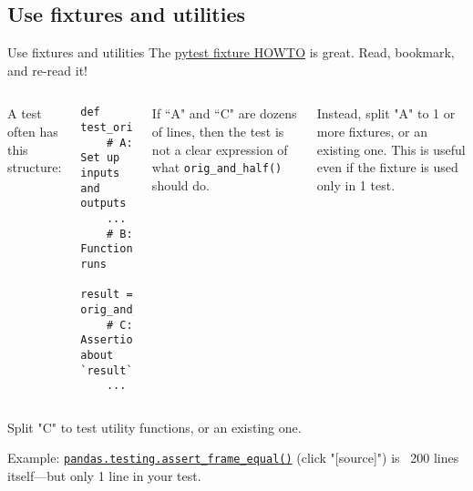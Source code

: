 \documentclass[12pt,aspectratio=169]{beamer}
\begin{document}
\subsection{Use fixtures and utilities}
\begin{frame}[fragile]{Use fixtures and utilities}
The \href{https://docs.pytest.org/en/stable/how-to/fixtures.html}{pytest fixture HOWTO} is great.
Read, bookmark, and re-read it!

\medskip
\begin{columns}[T]
\column{0.45\paperwidth}
A test often has this structure:

\medskip
\begin{verbatim}
def test_orig_and_half():
    # A: Set up inputs and outputs
    ...  
    # B: Function runs
    result = orig_and_half(input)
    # C: Assertions about `result`
    ...
\end{verbatim}

\column{0.45\paperwidth}
If “A" and “C" are dozens of lines, then the test is not a clear expression of what \texttt{orig_and_half()} should do.

\medskip
Instead, split "A" to 1 or more fixtures, or  an existing one.
This is useful even if the fixture is used only in 1 test.
\end{columns}

\medskip
Split "C" to test utility functions, or  an existing one.

\medskip
Example: \href{https://pandas.pydata.org/pandas-docs/stable/reference/api/pandas.testing.assert_frame_equal.html}{\texttt{pandas.testing.assert_frame_equal()}} (click "[source]") is ~200 lines itself—but only 1 line in your test.
\end{frame}
\end{document}
